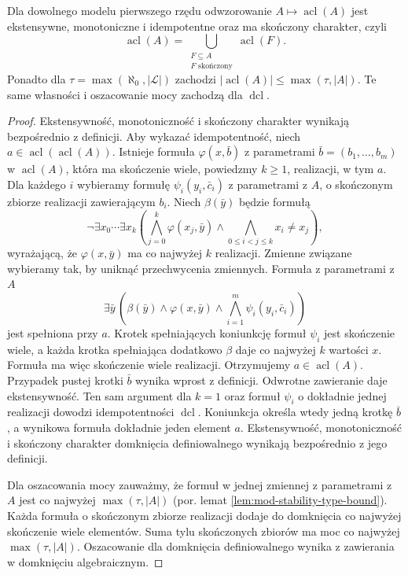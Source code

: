 \begin{twierdzenie}
\label{thm:mod-acl-closure}
Dla dowolnego modelu pierwszego rzędu
odwzorowanie $A\mapsto\operatorname{acl}(A)$
jest ekstensywne, monotoniczne i idempotentne
oraz ma skończony charakter, czyli
\[
\operatorname{acl}(A)=
\bigcup_{\substack{F\subseteq A\\ F\text{ skończony}}}
\operatorname{acl}(F).
\]
Ponadto dla $\tau=\max(\aleph_0,|\mathcal L|)$
zachodzi $|\operatorname{acl}(A)|\leq\max(\tau,|A|)$.
Te same własności i oszacowanie mocy zachodzą
dla $\operatorname{dcl}$.
\end{twierdzenie}
\begin{proof}
Ekstensywność, monotoniczność i skończony
charakter wynikają bezpośrednio z definicji.
Aby wykazać idempotentność, niech
$a\in\operatorname{acl}(\operatorname{acl}(A))$.
Istnieje formuła $\varphi(x,\bar b)$
z parametrami $\bar b=(b_1,\ldots,b_m)$
w $\operatorname{acl}(A)$, która ma skończenie
wiele, powiedzmy $k\geq1$, realizacji, w tym $a$.
Dla każdego $i$ wybieramy formułę
$\psi_i(y_i,\bar c_i)$ z parametrami z $A$,
o skończonym zbiorze realizacji zawierającym $b_i$.
Niech $\beta(\bar y)$ będzie formułą
\[
\neg\exists x_0\cdots\exists x_k\left(
\bigwedge_{j=0}^{k}\varphi(x_j,\bar y)
\land\bigwedge_{0\leq i<j\leq k}x_i\ne x_j
\right),
\]
wyrażającą, że $\varphi(x,\bar y)$ ma
co najwyżej $k$ realizacji. Zmienne związane
wybieramy tak, by uniknąć przechwycenia zmiennych.
Formuła z parametrami z $A$
\[
\exists\bar y\,
\left(\beta(\bar y)\land\varphi(x,\bar y)
\land\bigwedge_{i=1}^{m}\psi_i(y_i,\bar c_i)\right)
\]
jest spełniona przy $a$.
Krotek spełniających koniunkcję formuł $\psi_i$
jest skończenie wiele, a każda krotka spełniająca
dodatkowo $\beta$ daje co najwyżej $k$ wartości $x$.
Formuła ma więc skończenie wiele realizacji.
Otrzymujemy $a\in\operatorname{acl}(A)$.
Przypadek pustej krotki $\bar b$ wynika wprost
z definicji. Odwrotne zawieranie daje ekstensywność.
Ten sam argument dla $k=1$ oraz formuł $\psi_i$
o dokładnie jednej realizacji dowodzi idempotentności
$\operatorname{dcl}$. Koniunkcja określa wtedy
jedną krotkę $\bar b$, a wynikowa formuła dokładnie
jeden element $a$. Ekstensywność, monotoniczność
i skończony charakter domknięcia definiowalnego
wynikają bezpośrednio z jego definicji.

Dla oszacowania mocy zauważmy, że formuł
w jednej zmiennej z parametrami z $A$
jest co najwyżej $\max(\tau,|A|)$
(por. lemat \ref{lem:mod-stability-type-bound}).
Każda formuła o skończonym zbiorze realizacji
dodaje do domknięcia co najwyżej skończenie
wiele elementów. Suma tylu skończonych zbiorów
ma moc co najwyżej $\max(\tau,|A|)$.
Oszacowanie dla domknięcia definiowalnego wynika
z zawierania w domknięciu algebraicznym.
\end{proof}

